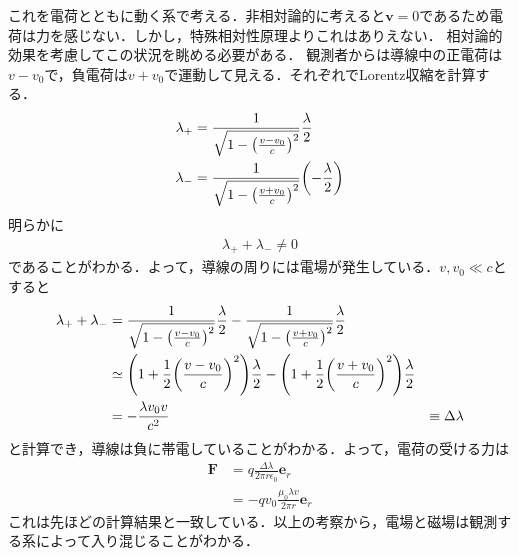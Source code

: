 \documentclass{report}
\begin{document}
  これを電荷とともに動く系で考える．非相対論的に考えると$\bm{v}=0$であるため電荷は力を感じない．しかし，特殊相対性原理よりこれはありえない．
  相対論的効果を考慮してこの状況を眺める必要がある．
  観測者からは導線中の正電荷は$v-v_0$で，負電荷は$v+v_0$で運動して見える．それぞれでLorentz収縮を計算する．
  \begin{align}
    \lambda_{+} &= \frac{1}{\sqrt{1-\qty(\frac{v-v_0}{c})^2}}\frac{\lambda}{2}\\
    \lambda_{-} &= \frac{1}{\sqrt{1-\qty(\frac{v+v_0}{c})^2}}\qty(-\frac{\lambda}{2})
  \end{align}
  明らかに
  \begin{align}
    \lambda_{+} + \lambda_{-} \neq 0
  \end{align}
  であることがわかる．よって，導線の周りには電場が発生している．$v,v_0 \ll c$とすると
  \begin{align}
    \lambda_{+} + \lambda_{-} &= \frac{1}{\sqrt{1-\qty(\frac{v-v_0}{c})^2}}\frac{\lambda}{2} - \frac{1}{\sqrt{1-\qty(\frac{v+v_0}{c})^2}}\frac{\lambda}{2}\\
    &\simeq \qty(1 + \frac{1}{2}\qty(\frac{v-v_0}{c})^2)\frac{\lambda}{2} - \qty(1 + \frac{1}{2}\qty(\frac{v+v_0}{c})^2)\frac{\lambda}{2}\\
    &= - \frac{\lambda v_0 v}{c^2}
    &\equiv \Delta \lambda
  \end{align}
  と計算でき，導線は負に帯電していることがわかる．よって，電荷の受ける力は
  \begin{align}
    \bm{F} &= q\frac{\Delta \lambda}{2\pi r \epsilon_0}\bm{e}_r\\
    &=-qv_0\frac{\mu_0 \lambda v}{2\pi r}\bm{e}_r
  \end{align}
  これは先ほどの計算結果と一致している．以上の考察から，電場と磁場は観測する系によって入り混じることがわかる．
\end{document}
